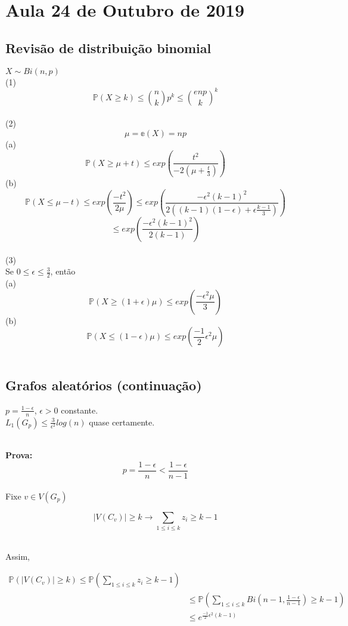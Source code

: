 \section{Aula 24 de Outubro de 2019}
\label{2019_10_24}

\subsection{Revisão de distribuição binomial}
$X\sim Bi(n,p)$
\\
(1) 
\[\mathbb{P}(X \geq k) \leq {n\choose k}p^{k} \leq {enp\choose k}^{k}\]
\\
(2)
\[\mu = \mathbb{e}(X) = np \]
(a)
\[\mathbb{P}(X \geq \mu +t) \leq exp(\frac{t^{2}}{-2(\mu+\frac{t}{3})})\]
(b)
\[\mathbb{P}(X \leq \mu -t) \leq exp(\frac{-t^{2}}{2\mu}) \leq exp(\frac{-\epsilon^{2}(k-1)^{2}}{2((k-1)(1-\epsilon)+\epsilon\frac{k-1}{3})}) \]
\[\leq exp(\frac{-\epsilon^{2}(k-1)^{2}}{2(k-1)}) \]
\\
(3)
\\
Se $ 0 \leq \epsilon \leq \frac{3}{2} $, então
\\
(a)
\\
\[\mathbb{P}(X \geq (1+\epsilon)\mu) \leq exp(\frac{-\epsilon^{2}\mu}{3}) \]
(b)
\[\mathbb{P}(X \leq (1-\epsilon)\mu) \leq exp(\frac{-1}{2}\epsilon^{2}\mu) \]
\\
\subsection{Grafos aleatórios (continuação)}
\begin{teorema}
$p = \frac{1 - \epsilon}{n} $, $\epsilon > 0$ constante.
\\
$L_{1}(G_{p}) \leq \frac{3}{\epsilon^{2}} log(n)$ quase certamente.
\end{teorema}
\\
\textbf{Prova:}\\

\[p = \frac{1-\epsilon}{n} < \frac{1-\epsilon}{n-1}\]
\\
Fixe $v\in V(G_{p})$\\

\begin{fato}
\[|V(C_{v})| \geq k \rightarrow \sum_{1\leq i \leq k} z_{i} \geq k-1\]
\end{fato}
\\
Assim,

\begin{align*}
	\mathbb{P}(|V(C_{v})|\geq k) \leq \mathbb{P}( \sum_{1\leq i \leq k} z_{i} \geq k-1) \\
	&\leq \mathbb{P}(\sum_{1\leq i \leq k} Bi(n-1,\frac{1-\epsilon}{n-1}) \geq k-1) \\
	&\leq e^{\frac{-1}{2}\epsilon^{2}(k-1)}
\end{align*}

